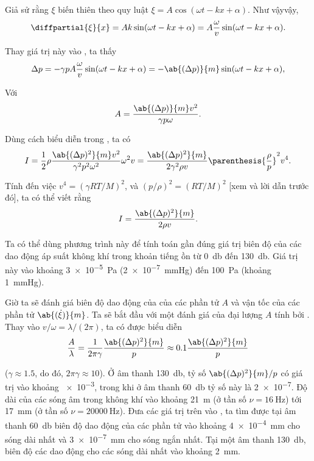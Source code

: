 Giả sử rằng $\xi$ biến thiên theo quy luật
$\xi=A\cos(\omega t-kx+\alpha)$.
Như vậyvậy,
\begin{equation*}
	\diffpartial{\xi}{x} = Ak \sin(\omega t - k x + \alpha) = A \frac{\omega}{v} \sin(\omega t - k x + \alpha).
\end{equation*}

\noindent
Thay giá trị này vào , ta thấy
\begin{equation*}
	\Delta{p} = - \gamma p A \frac{\omega}{v} \sin(\omega t - kx + \alpha) = - \ab{(\Delta{p})}{m} \sin(\omega t - kx + \alpha),
\end{equation*}

\noindent
Với
\begin{equation}\label{eq:14_73}
	A = \frac{\ab{(\Delta{p})}{m} v^2}{\gamma p \omega}.
\end{equation}

\noindent
Dùng cách biểu diễn trong , ta có
\begin{equation*}
	I = \frac{1}{2} \rho \frac{\ab{(\Delta{p})^2}{m} v^2}{\gamma^2 p^2 \omega^2} \omega^2 v = \frac{\ab{(\Delta{p})^2}{m}}{2 \gamma^2 \rho v} \parenthesis{\frac{\rho}{p}}^2 v^4.
\end{equation*}

\noindent
Tính đến việc $v^4 = (\gamma RT/M)^2$, và $(p/\rho)^2 = (RT/M)^2$ [xem  và lời dẫn trước đó], ta có thể viết rằng
\begin{equation}\label{eq:14_74}
	I = \frac{\ab{(\Delta{p})^2}{m}}{2 \rho v}.
\end{equation}

\noindent
Ta có thể dùng phương trình này để tính toán gần đúng giá trị biên độ của các dao động áp suất không khí trong khoản tiếng ồn từ \SI{0}{\decibel} đến \SI{130}{\decibel}.
Giá trị này vào khoảng \SI{3e-5}{\pascal} (\SI{2e-7}{\mmHg}) đến \SI{100}{\pascal} (khoảng \SI{1}{\mmHg}).

Giờ ta sẽ đánh giá biên độ dao động của của các phần tử $A$ và vận tốc của các phần tử $\ab{(\dot{\xi})}{m}$.
Ta sẽ bắt đầu với một đánh giá của đại lượng $A$ tính bởi .
Thay vào $v/\omega=\lambda/(2\pi)$, ta có được biểu diễn
\begin{equation}\label{eq:14_75}
	\frac{A}{\lambda} = \frac{1}{2\pi\gamma} \frac{\ab{(\Delta{p})^2}{m}}{p} \approx 0.1 \frac{\ab{(\Delta{p})^2}{m}}{p}
\end{equation}

\noindent
($\gamma \approx 1.5$, do đó, $2 \pi \gamma \approx 10$).
Ở âm thanh \SI{130}{\decibel}, tỷ số $\ab{(\Delta{p})^2}{m}/p$ có giá trị vào khoảng \num{e-3}, trong khi ở âm thanh \SI{60}{\decibel} tỷ số này là \num{2e-7}.
Độ dài của các sóng âm trong không khí vào khoảng \SI{21}{\metre} (ở tần số $\nu = \SI{16}{\hertz}$) tới \SI{17}{\milli\metre} (ở tần số $\nu = \SI{20000}{\hertz}$).
Đưa các giá trị trên vào , ta tìm được tại âm thanh \SI{60}{\decibel} biên độ dao động của các phần tử vào khoảng \SI{4e-4}{\milli\metre} cho sóng dài nhất và \SI{3e-7}{\milli\metre} cho sóng ngắn nhất.
Tại một âm thanh \SI{130}{\decibel}, biên độ các dao động cho các sóng dài nhất vào khoảng \SI{2}{\milli\metre}.

